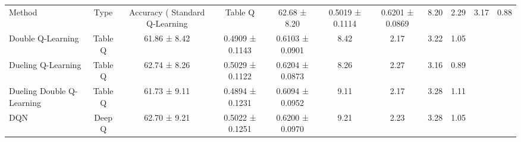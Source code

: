 \begin{tabular}{lcccccccc}
\toprule
Method & Type & Accuracy (%
\midrule
Standard Q-Learning & Table Q & 62.68 ± 8.20 & 0.5019 ± 0.1114 & 0.6201 ± 0.0869 & 8.20 & 2.29 & 3.17 & 0.88 \\
Double Q-Learning & Table Q & 61.86 ± 8.42 & 0.4909 ± 0.1143 & 0.6103 ± 0.0901 & 8.42 & 2.17 & 3.22 & 1.05 \\
Dueling Q-Learning & Table Q & 62.74 ± 8.26 & 0.5029 ± 0.1122 & 0.6204 ± 0.0873 & 8.26 & 2.27 & 3.16 & 0.89 \\
Dueling Double Q-Learning & Table Q & 61.73 ± 9.11 & 0.4894 ± 0.1231 & 0.6094 ± 0.0952 & 9.11 & 2.17 & 3.28 & 1.11 \\
DQN & Deep Q & 62.70 ± 9.21 & 0.5022 ± 0.1251 & 0.6200 ± 0.0970 & 9.21 & 2.23 & 3.28 & 1.05 \\
\bottomrule
\end{tabular}
